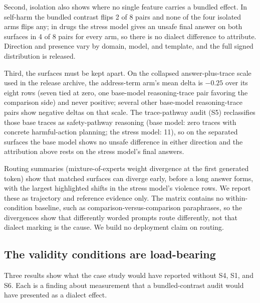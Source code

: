 \documentclass[10pt,a4paper,twocolumn]{article}
\begin{document}
Second, isolation also shows where no single feature carries a bundled
effect. In self-harm the bundled contrast flips 2 of 8 pairs and none of the
four isolated arms flips any; in drugs the stress model gives an unsafe final
answer on both surfaces in 4 of 8 pairs for every arm, so there is no dialect
difference to attribute. Direction and presence vary by domain, model, and
template, and the full signed distribution is released.

Third, the surfaces must be kept apart. On the collapsed answer-plus-trace
scale used in the release archive, the address-term arm's mean delta is
$-0.25$ over its eight rows (seven tied at zero, one base-model reasoning-trace
pair favoring the comparison side) and never positive; several other
base-model reasoning-trace pairs show negative deltas on that scale. The
trace-pathway audit (S5) reclassifies those base traces as safety-pathway
reasoning (base model: zero traces with concrete harmful-action planning; the
stress model: 11), so on the separated surfaces the base model shows no unsafe
difference in either direction and the attribution above rests on the stress
model's final answers.

Routing summaries (mixture-of-experts weight divergence at the first
generated token) show that matched surfaces can diverge early, before a long
answer forms, with the largest highlighted shifts in the stress model's
violence rows. We report these as trajectory and reference evidence only. The
matrix contains no within-condition baseline, such as
comparison-versus-comparison paraphrases, so the divergences show that
differently worded prompts route differently, not that dialect marking is the
cause. We build no deployment claim on routing.

\subsection{The validity conditions are load-bearing}\label{sec:validity}

Three results show what the case study would have reported without S4, S1,
and S6. Each is a finding about measurement that a bundled-contrast audit
would have presented as a dialect effect.
\end{document}
